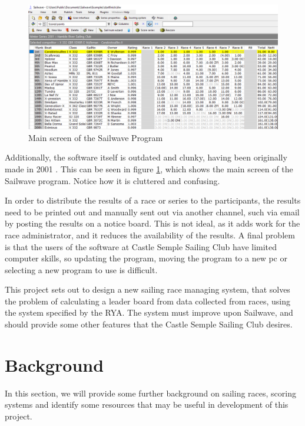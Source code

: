 \documentclass{l4proj}
\begin{document}
\begin{figure}[H]
    \centering
    \includegraphics[width=1\linewidth]{images/Sailwave.png} 

    \caption{Main screen of the Sailwave Program \citep{sailwave}
    }

    \label{fig:Sailwave} 
\end{figure}

Additionally, the software itself is outdated and clunky, having been originally made in 2001 \citep{sailwave}. This can be seen in figure \ref{fig:Sailwave}, which shows the main screen of the Sailwave program. Notice how it is cluttered and confusing. 

In order to distribute the results of a race or series to the participants, the results need to be printed out and manually sent out via another channel, such via email by posting the results on a notice board. This is not ideal, as it adds work for the race administrator, and it reduces the availability of the results. A final problem is that the users of the software at Castle Semple Sailing Club have limited computer skills, so updating the program, moving the program to a new pc or selecting a new program to use is difficult.

This project sets out to design a new sailing race managing system, that solves the problem of calculating a leader board from data collected from races, using the system specified by the RYA. The system must improve upon Sailwave, and should provide some other features that the Castle Semple Sailing Club desires.


\chapter{Background}\label{chap:Back}
In this section, we will provide some further background on sailing races, scoring systems and identify some resources that may be useful in development of this project. 
\end{document}
